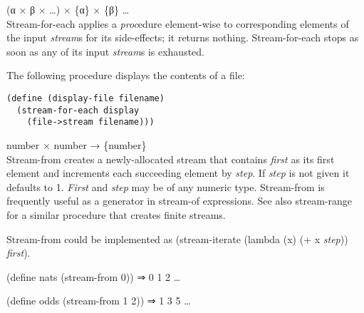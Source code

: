 \begin{entry}{%
  }

  (α × β × \ldots{}) × \{α\} × \{β\} \ldots{}\\
  Stream-for-each applies a \emph{proc}edure element-wise to
  corresponding elements of the input \emph{stream}s for its
  side-effects; it returns nothing. Stream-for-each stops as soon as
  any of its input \emph{stream}s is exhausted.


  The following procedure displays the contents of a file:

\begin{verbatim}
(define (display-file filename)
  (stream-for-each display
    (file->stream filename)))
\end{verbatim}
\end{entry}

\begin{entry}{%
  }

  number × number → \{number\}\\
  Stream-from creates a newly-allocated stream that contains
  \emph{first} as its first element and increments each succeeding
  element by \emph{step}. If \emph{step} is not given it defaults to
  1. \emph{First} and \emph{step} may be of any numeric
  type. Stream-from is frequently useful as a generator in stream-of
  expressions. See also stream-range for a similar procedure that
  creates finite streams.

  Stream-from could be implemented as (stream-iterate (lambda (x) (+ x
  \emph{step})) \emph{first}).

  (define nats (stream-from 0)) ⇒ 0 1 2 \ldots{}

  (define odds (stream-from 1 2)) ⇒ 1 3 5 \ldots{}
\end{entry}

